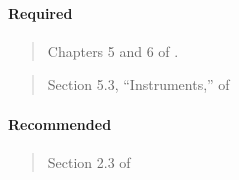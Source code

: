 \documentclass[12pt]{article}
\begin{document}
\paragraph*{Required}

\begin{verse} Chapters 5 and 6 of . \end{verse}

\begin{verse}
  Section 5.3, ``Instruments,'' of  \end{verse}

\begin{verse}
 \end{verse}

\paragraph*{Recommended}

\begin{verse} Section 2.3 of  \end{verse}

\begin{verse}  \end{verse}

\begin{verse}  \end{verse}

\begin{verse}  \end{verse}

\begin{verse}  \end{verse}

\begin{verse}  \end{verse}

\begin{verse}  \end{verse}

\begin{verse}  \end{verse}

\begin{verse}  \end{verse}
\end{document}
